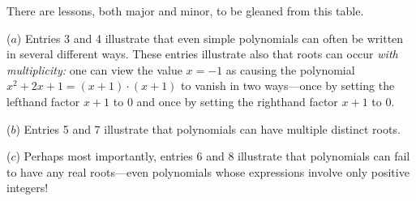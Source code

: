 \smallskip

\noindent
There are lessons, both major and minor, to be gleaned from this
table.

\noindent
($a$) Entries 3 and 4 illustrate that even simple polynomials can often be
written in several different ways.  These entries illustrate also that
roots can occur {\em with multiplicity:}
one can view the value $x = -1$ as causing the polynomial $x^2 + 2x +1
= (x+1)\cdot (x+1)$ to vanish in two ways---once by setting the
lefthand factor $x+1$ to $0$ and once by setting the righthand factor
$x+1$ to $0$.

\noindent
($b$) Entries 5 and 7 illustrate that polynomials can have multiple
distinct roots.

\noindent
($c$) Perhaps most importantly, entries 6 and 8 illustrate that
polynomials can fail to have any real roots---even polynomials whose
expressions involve only positive integers!
\medskip

